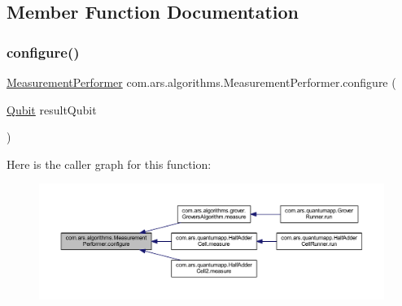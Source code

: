 \subsection{Member Function Documentation}
\hypertarget{classcom_1_1ars_1_1algorithms_1_1_measurement_performer_a2859e53e337d327fe64711724ef46175}{}\label{classcom_1_1ars_1_1algorithms_1_1_measurement_performer_a2859e53e337d327fe64711724ef46175} 
\subsubsection{\texorpdfstring{configure()}{configure()}}
{\footnotesize\ttfamily \hyperlink{classcom_1_1ars_1_1algorithms_1_1_measurement_performer}{Measurement\+Performer} com.\+ars.\+algorithms.\+Measurement\+Performer.\+configure (\begin{DoxyParamCaption}\item[{\hyperlink{classcom_1_1ars_1_1qubits_1_1_qubit}{Qubit}}]{result\+Qubit }\end{DoxyParamCaption})}

Here is the caller graph for this function\+:
\nopagebreak
\begin{figure}[H]
\begin{center}
\leavevmode
\includegraphics[width=350pt]{classcom_1_1ars_1_1algorithms_1_1_measurement_performer_a2859e53e337d327fe64711724ef46175_icgraph}
\end{center}
\end{figure}
\hypertarget{classcom_1_1ars_1_1algorithms_1_1_measurement_performer_aaa613379c40e0b083f5ce81e6ba59f72}{}\label{classcom_1_1ars_1_1algorithms_1_1_measurement_performer_aaa613379c40e0b083f5ce81e6ba59f72} 
